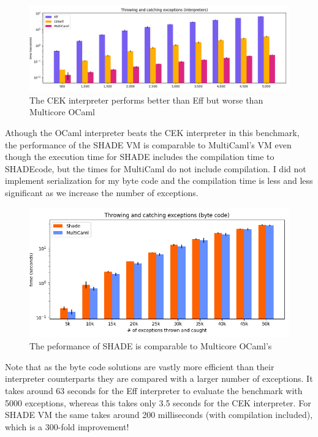 \documentclass[class=article, crop=false]{standalone}
\begin{document}
\begin{figure}
    \centering
    \includegraphics[width=40em]{eval_plots/interp_exception.png}
    \caption{The CEK interpreter performs better than Eff but worse than
    Multicore OCaml}
    \label{fig:exception-interpreters}
\end{figure}

Athough the OCaml interpreter beats the CEK interpreter in this benchmark, the
performance of the SHADE VM is comparable to MultiCaml's VM even though the
execution time for SHADE includes the compilation time to SHADEcode,
but the times for MultiCaml do not include compilation. I did not implement
serialization for my byte code and the compilation time is less and less
significant as we increase the number of exceptions.

\begin{figure}
    \centering
    \includegraphics[width=35em]{eval_plots/comp_exception.png}
    \caption{The peformance of SHADE is comparable to Multicore OCaml's}
    \label{fig:exception-bytecode}
\end{figure}

Note that as the byte code solutions are vastly more efficient than their
interpreter counterparts they are compared with a larger number of exceptions.
It takes around 63 seconds for the Eff interpreter to evaluate the benchmark
with 5000 exceptions, whereas this takes only 3.5 seconds for the CEK
interpreter. For SHADE VM the same takes around 200 milliseconds
(with compilation included), which is a 300-fold improvement!
\end{document}
